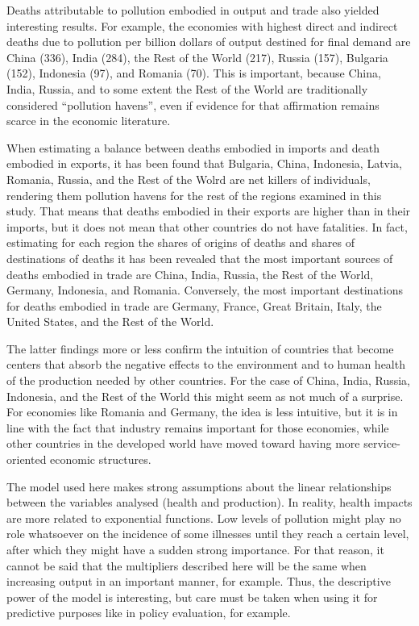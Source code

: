 \documentclass[a4paper,12pt]{article}
\begin{document}
Deaths attributable to pollution embodied in output and trade also yielded interesting results. For example, the economies with highest direct and indirect deaths due to pollution per billion dollars of output destined for final demand are China (336), India (284), the Rest of the World (217), Russia (157), Bulgaria (152), Indonesia (97), and Romania (70). This is important, because China, India, Russia, and to some extent the Rest of the World are traditionally considered ``pollution havens'', even if evidence for that affirmation remains scarce in the economic literature.

When estimating a balance between deaths embodied in imports and death embodied in exports, it has been found that Bulgaria, China, Indonesia, Latvia, Romania, Russia, and the Rest of the Wolrd are net killers of individuals, rendering them pollution havens for the rest of the regions examined in this study. That means that deaths embodied in their exports are higher than in their imports, but it does not mean that other countries do not have fatalities. In fact, estimating for each region the shares of origins of deaths and shares of destinations of deaths it has been revealed that the most important sources of deaths embodied in trade are China, India, Russia, the Rest of the World, Germany, Indonesia, and Romania. Conversely, the most important destinations for deaths embodied in trade are Germany, France, Great Britain, Italy, the United States, and the Rest of the World.

The latter findings more or less confirm the intuition of countries that become centers that absorb the negative effects to the environment and to human health of the production needed by other countries. For the case of China, India, Russia, Indonesia, and the Rest of the World this might seem as not much of a surprise. For economies like Romania and Germany, the idea is less intuitive, but it is in line with the fact that industry remains important for those economies, while other countries in the developed world have moved toward having more service-oriented economic structures.

The model used here makes strong assumptions about the linear relationships between the variables analysed (health and production). In reality, health impacts are more related to exponential functions. Low levels of pollution might play no role whatsoever on the incidence of some illnesses until they reach a certain level, after which they might have a sudden strong importance. For that reason, it cannot be said that the multipliers described here will be the same when increasing output in an important manner, for example. Thus, the descriptive power of the model is interesting, but care must be taken when using it for predictive purposes like in policy evaluation, for example.
\end{document}

